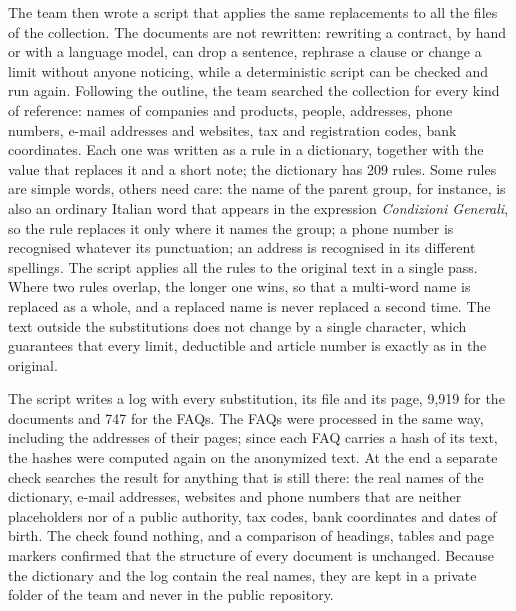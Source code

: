 The team then wrote a script that applies the same replacements to all the files of the
collection. The documents are not rewritten: rewriting a contract, by hand or with a language
model, can drop a sentence, rephrase a clause or change a limit without anyone noticing, while a
deterministic script can be checked and run again. Following the outline, the team searched the
collection for every kind of reference: names of companies and products, people, addresses, phone numbers, e-mail addresses
and websites, tax and registration codes, bank coordinates. Each one was written as a rule in a
dictionary, together with the value that replaces it and a short note; the dictionary has 209
rules. Some rules are simple words, others need care: the name of the
parent group, for instance, is also an ordinary Italian word that appears in the expression
\textit{Condizioni Generali}, so the rule replaces it only where it names the group; a phone number
is recognised whatever its punctuation; an address is recognised in its different spellings.
The script applies all the rules to the original text in a single pass. Where two rules
overlap, the longer one wins, so that a multi-word name is replaced as a whole, and a replaced name
is never replaced a second time. The text outside the substitutions does not change by a single
character, which guarantees that every limit, deductible and article number is exactly as in the
original.

The script writes a log with every substitution, its file and its page, 9{,}919 for the
documents and 747 for the FAQs. The FAQs were processed in the same way, including the
addresses of their pages; since each FAQ carries a hash of its text, the hashes were computed again
on the anonymized text. At the end a separate check searches the result for anything that is still
there: the real names of the dictionary, e-mail addresses, websites and phone numbers that are
neither placeholders nor of a public authority, tax codes, bank coordinates and dates of birth. The
check found nothing, and a comparison of headings, tables and page markers confirmed that the
structure of every document is unchanged. Because the dictionary and the log contain the real
names, they are kept in a private folder of the team and never in the public repository.

\iffalse
